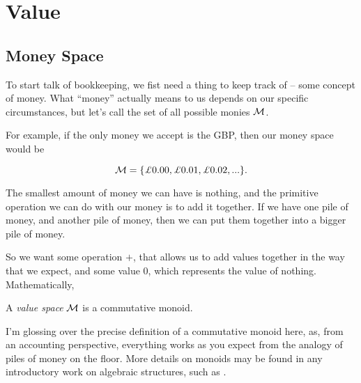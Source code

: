 \section{Value}

\subsection{Money Space}

To start talk of bookkeeping, we fist need a thing to keep track of -- some concept of money.
What ``money'' actually means to us depends on our specific circumstances, but let's call the set of all possible monies $\mathcal{M}$.

\begin{example}
    For example, if the only money we accept is the GBP, then our money space would be

    \begin{equation}
        \label{m-def}
        \M = \{ \pounds 0.00, \pounds 0.01, \pounds 0.02, ... \}.
    \end{equation}
\end{example}

The smallest amount of money we can have is nothing,
and the primitive operation we can do with our money is to add it together.
If we have one pile of money, and another pile of money, then we can put them together into a bigger pile of money.

So we want some operation $+$, that allows us to add values together in the way that we expect,
and some value $0$, which represents the value of nothing.
Mathematically,

\begin{definition}
    A \emph{value space} $\mathcal{M}$ is a commutative monoid.
\end{definition}

I'm glossing over the precise definition of a commutative monoid here, as, from an accounting perspective,
everything works as you expect from the analogy of piles of money on the floor.
More details on monoids may be found in any introductory work on algebraic structures, such as \cite{monoids}.


